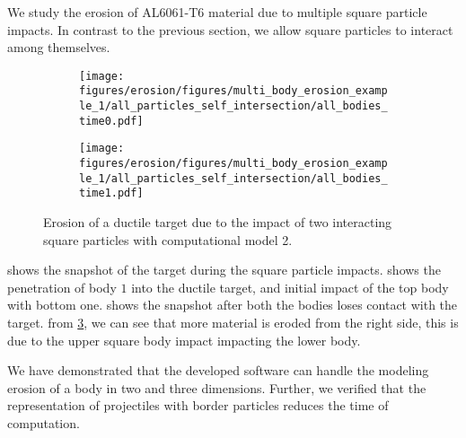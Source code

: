 We study the erosion of AL6061-T6 material due to multiple square particle
impacts. In contrast to the previous section, we allow square particles to
interact among themselves.

\begin{figure}[tpb]
  \centering
  \begin{subfigure}{0.48\textwidth}
    \centering
    \texttt{[image: figures/erosion/figures/multi\_body\_erosion\_example\_1/all\_particles\_self\_intersection/all\_bodies\_time0.pdf]}
    \subcaption{}
    \label{fig:mpe-1-full-a}
  \end{subfigure}
  \begin{subfigure}{0.48\textwidth}
    \centering
    \texttt{[image: figures/erosion/figures/multi\_body\_erosion\_example\_1/all\_particles\_self\_intersection/all\_bodies\_time1.pdf]}
    \subcaption{}
    \label{fig:mpe-1-full-b}
  \end{subfigure}
  \caption{Erosion of a ductile target due to the impact of two interacting
    square particles with computational model 2.}
\label{fig:mpe-1-full}
\end{figure}
 shows the snapshot of the target during the square
particle impacts.  shows the penetration of body $1$ into
the ductile target, and initial impact of the top body with bottom one.
 shows the snapshot after both the bodies loses contact
with the target. from \cref{fig:mpe-1-full}, we can see that more material is
eroded from the right side, this is due to the upper square body impact
impacting the lower body.


We have demonstrated that the developed software can handle the modeling erosion
of a body in two and three dimensions. Further, we verified that the representation of
projectiles with border particles reduces the time of computation.

